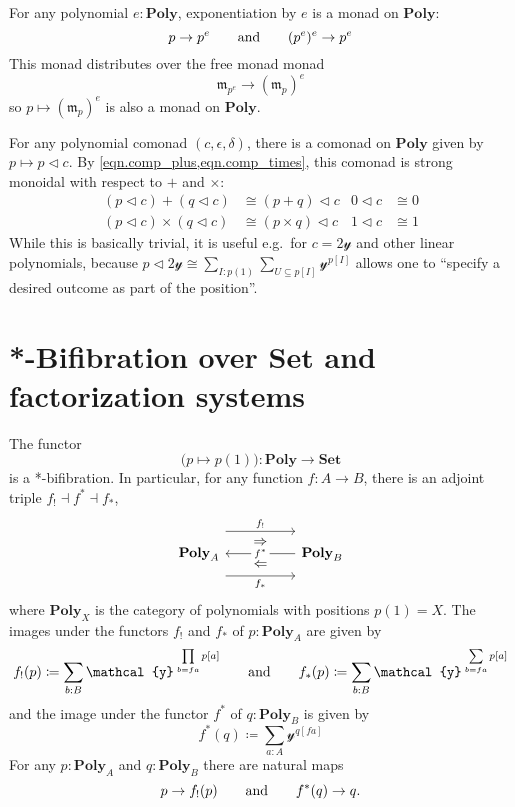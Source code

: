 \documentclass[11pt, one side, article]{memoir}
\theoremstyle{definition}
\theoremstyle{plain}
\renewcommand{\ss}{\subseteq}
\newcommand{\Cat}[1]{\mathbf{#1}}%
\newcommand{\tn}[1]{\textnormal{#1}}
\newcommand{\smset}{\Cat{Set}}
\newcommand{\yon}{{\mathcal{y}}}
\newcommand{\poly}{\Cat{Poly}}
\newcommand{\0}{\textsf{0}}
\newcommand{\1}{\tn{\textsf{1}}}
\newcommand{\tri}{\mathbin{\triangleleft}}
\newcommand{\free}{\mathfrak{m}}
\newcommand{\hh}[2][]{#1 \tn{#2} #1}
\newcommand{\qqand}{\hh[\qquad]{and}}
\begin{document}
For any polynomial $e:\poly$, exponentiation by $e$ is a monad on $\poly$:
\begin{equation}
	p\to p^e
	\qqand
	(p^e)^e\to p^e
\end{equation}
This monad distributes over the free monad monad
\begin{equation}
	\free_{p^e}\to(\free_p)^e
\end{equation}
so $p\mapsto(\free_p)^e$ is also a monad on $\poly$.

For any polynomial comonad $(c,\epsilon,\delta)$, there is a comonad on $\poly$ given by $p\mapsto p\tri c$. By \cref{eqn.comp_plus,eqn.comp_times}, this comonad is strong monoidal with respect to $+$ and $\times$:
\begin{align}
	(p\tri c)+(q\tri c)&\cong (p+q)\tri c&0\tri c&\cong0\\
	(p\tri c)\times(q\tri c)&\cong (p\times q)\tri c&1\tri c&\cong1	
\end{align}
While this is basically trivial, it is useful e.g.\ for $c=2\yon$ and other linear polynomials, because $p\tri 2\yon\cong\sum_{I:p(1)}\sum_{U\ss p[I]}\yon^{p[I]}$ allows one to ``specify a desired outcome as part of the position''.

\chapter{*-Bifibration over $\smset$ and factorization systems}\label{chap.bifib}

The functor
\begin{equation}\label{eqn.bifib}
\big(p\mapsto p(1)\big)\colon\poly\to\smset
\end{equation}
is a *-bifibration. In particular, for any function $f\colon A\to B$, there is an adjoint triple $f_!\dashv f^*\dashv f_*$,
\begin{equation}
\begin{tikzcd}[column sep=50pt]
	\poly_A
		\ar[r, shift left=16pt, "f_!"]
		\ar[r, shift right=16pt, "f_*"']
		\ar[from=r, "f^*" description]
		\ar[r, phantom, shift left=8pt, "\Rightarrow"]
		\ar[r, phantom, shift right=8pt, "\Leftarrow"]
	&
	\poly_B
\end{tikzcd}
\end{equation}
where $\poly_X$ is the category of polynomials with positions $p(1)=X$. The images under the functors $f_!$ and $f_*$ of $p:\poly_A$ are given by
\begin{equation}
	f_!(p)\coloneqq\sum_{b: B}\yon^{\;\prod\limits_{b=fa}p[a]}
	\qqand
	f_*(p)\coloneqq\sum_{b: B}\yon^{\;\sum\limits_{b=fa}p[a]}
\end{equation}
and the image under the functor $f^*$ of $q:\poly_B$ is given by
\begin{equation}
	f^*(q)\coloneqq\sum_{a: A}\yon^{q[fa]}
\end{equation}
For any $p:\poly_A$ and $q:\poly_B$ there are natural maps
\begin{equation}
	p\to f_!(p)
	\qqand
	f^*(q)\to q.
\end{equation}
\end{document}

